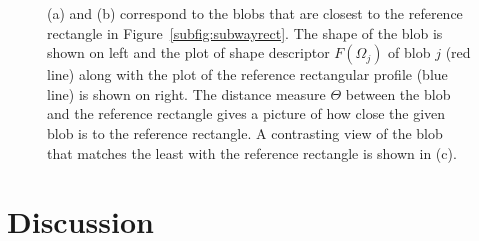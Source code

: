 \documentclass {udthesis}
\begin{document}
\begin{figure} 
\centering
{}
\caption{(a) and (b) correspond to the blobs that are closest to the reference rectangle in Figure~\ref{subfig:subwayrect}. The shape of the blob is shown on left and the plot of shape descriptor $F(\Omega_j)$ of blob $j$ (red line) along with the plot of the reference rectangular profile (blue line) is shown on right. The distance measure $\Theta$ between the blob and the reference rectangle gives a picture of how close the given blob is to the reference rectangle. A contrasting view of the blob that matches the least with the reference rectangle is shown in (c).}
\end{figure}      


\section{Discussion}
\end{document}
